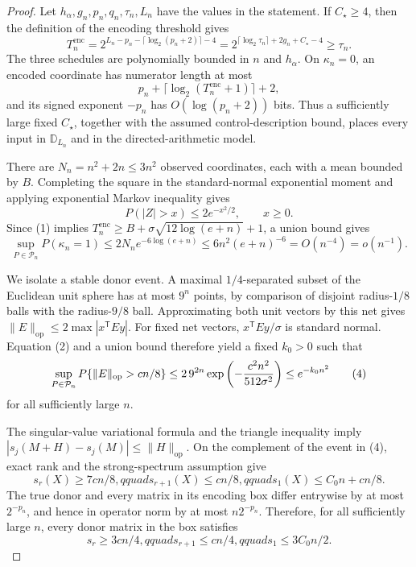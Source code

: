 \documentclass{article}
\begin{document}
\begin{proof}
Let \(h_\alpha,g_n,p_n,q_n,\tau_n,L_n\) have the values in the statement.  If
\(C_\star\ge4\), then the definition of the encoding threshold gives
\[
T_n^{\mathrm{enc}}
=2^{L_n-p_n-\lceil\log_2(p_n+2)\rceil-4}
=2^{\lceil\log_2\tau_n\rceil+2g_n+C_\star-4}
\ge\tau_n.                                                            \tag{1}
\]
The three schedules are polynomially bounded in \(n\) and
\(h_\alpha\).  On \(\kappa_n=0\), an encoded coordinate has numerator length
at most
\[
p_n+\lceil\log_2(T_n^{\mathrm{enc}}+1)\rceil+2,
\]
and its signed exponent \(-p_n\) has \(O(\log(p_n+2))\) bits.  Thus a sufficiently
large fixed \(C_\star\), together with the assumed control-description bound,
places every input in \(\mathbb D_{L_n}\) and in the directed-arithmetic model.

There are \(N_n=n^2+2n\le3n^2\) observed coordinates, each with a mean bounded
by \(B\).  Completing the square in the standard-normal exponential moment and
applying exponential Markov inequality gives
\[
P(|Z|>x)\le2e^{-x^2/2},\qquad x\ge0.                                  \tag{2}
\]
Since (1) implies
\(T_n^{\mathrm{enc}}\ge B+\sigma\sqrt{12\log(e+n)}+1\), a union bound gives
\[
\sup_{P\in\mathcal P_n}P(\kappa_n=1)
\le2N_ne^{-6\log(e+n)}
\le6n^2(e+n)^{-6}=O(n^{-4})=o(n^{-1}).                                \tag{3}
\]

We isolate a stable donor event.  A maximal \(1/4\)-separated subset of the
Euclidean unit sphere has at most \(9^n\) points, by comparison of disjoint
radius-\(1/8\) balls with the radius-\(9/8\) ball.  Approximating both unit
vectors by this net gives
\(\|E\|_{
\mathrm{op}}\le2\max|x^{\mathsf T}Ey|\).  For fixed net vectors,
\(x^{\mathsf T}Ey/\sigma\) is standard normal.  Equation (2) and a union bound
therefore yield a fixed \(k_0>0\) such that
\[
\sup_{P\in\mathcal P_n}
P\{\|E\|_{
\mathrm{op}}>cn/8\}
\le2\,9^{2n}\exp\left(-{c^2n^2\over512\sigma^2}\right)
\le e^{-k_0n^2}                                                       \tag{4}
\]
for all sufficiently large \(n\).

The singular-value variational formula and the triangle inequality imply
\(|s_j(M+H)-s_j(M)|\le\|H\|_{
\mathrm{op}}\).  On the complement of the event in (4), exact rank and the
strong-spectrum assumption give
\[
s_r(X)\ge7cn/8,qquad s_{r+1}(X)\le cn/8,qquad
s_1(X)\le C_0n+cn/8.                                                  \tag{5}
\]
The true donor and every matrix in its encoding box differ entrywise by at most
\(2^{-p_n}\), and hence in operator norm by at most \(n2^{-p_n}\).  Therefore,
for all sufficiently large \(n\), every donor matrix in the box satisfies
\[
s_r\ge3cn/4,qquad s_{r+1}\le cn/4,qquad s_1\le3C_0n/2.              \tag{6}
\]


\end{proof}
\end{document}
